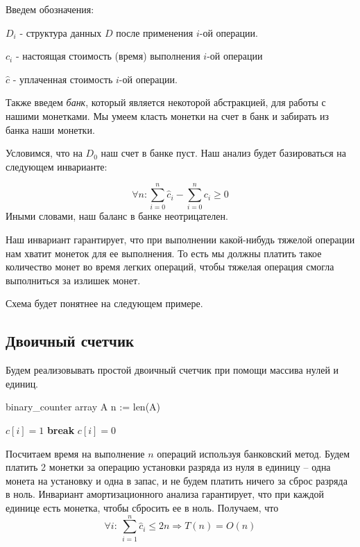 \documentclass[../main.tex]{subfiles}
\begin{document}
	Введем обозначения:
	\begin{sign}
		$D_i$ - структура данных $D$ после применения $i$-ой операции.
	\end{sign}
	\begin{sign}
		$c_i$ - настоящая стоимость (время) выполнения $i$-ой операции
	\end{sign}
	\begin{sign}
		$\hat{c}$ - уплаченная стоимость $i$-ой операции. 
	\end{sign}
	
	Также введем \textit{банк}, который является некоторой абстракцией, для работы с нашими монетками. Мы умеем класть монетки на счет в банк и забирать из банка наши монетки. 
	
	Условимся, что на $D_0$ наш счет в банке пуст. Наш анализ будет базироваться на следующем инварианте: %
	
	\[
	\forall n : \sum_{i = 0}^n \hat{c}_i - \sum_{i = 0}^{n} c_i \geqslant 0	
	\]
	Иными словами, наш баланс в банке неотрицателен.
	
	Наш инвариант гарантирует, что при выполнении какой-нибудь тяжелой операции нам хватит монеток для ее выполнения. То есть мы должны платить такое количество монет во время легких операций, чтобы тяжелая операция смогла выполниться за излишек монет.
	
	
	Схема будет понятнее на следующем примере.
	
	
	\subsection{Двоичный счетчик}
	
	Будем реализовывать простой двоичный счетчик при помощи массива нулей и единиц.
	
	\begin{struct}{binary\_counter}
		\State array A
		\State n := len(A)
		
					\State $c[i] = 1$
					\State \textbf{break}
				\Else
					\State $c[i] = 0$
				\EndIf
			\EndFor
		\EndFunction
	\end{struct}
	
	Посчитаем время на выполнение $n$ операций используя банковский метод. Будем платить 2 монетки за операцию установки разряда из нуля в единицу -- одна монета на установку и одна в запас, и не будем платить ничего за сброс  разряда в ноль. Инвариант амортизационного анализа гарантирует, что при каждой единице есть монетка, чтобы сбросить ее в ноль. Получаем, что 
	\[
	\forall i: \ \sum_{i = 1}^{n} \hat{c}_i \leqslant 2n \Rightarrow T(n) = O(n)
	\]
	
	
	
	
	
	
	
	
	
	
	
	
	
	
	
	
	
	
	
	
	\pagebreak
\end{document}
